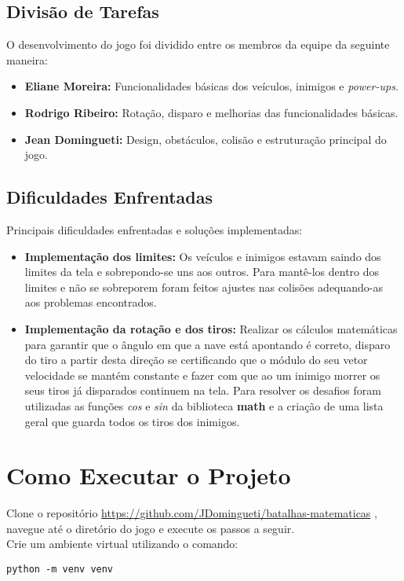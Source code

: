 \documentclass[12pt,a4paper]{article}
\begin{document}
\subsection{Divisão de Tarefas}
O desenvolvimento do jogo foi dividido entre os membros da equipe da seguinte maneira:
\begin{itemize}
    \item \textbf{Eliane Moreira:} Funcionalidades básicas dos veículos, inimigos e \textit{power-ups}.
    \item \textbf{Rodrigo Ribeiro:} Rotação, disparo e melhorias das funcionalidades básicas.
    \item \textbf{Jean Domingueti:} Design, obstáculos, colisão e estruturação principal do jogo.
\end{itemize}

\subsection{Dificuldades Enfrentadas}
Principais dificuldades enfrentadas e soluções implementadas: 
\begin{itemize}
    \item \textbf{Implementação dos limites:} Os veículos e inimigos estavam saindo dos limites da tela e sobrepondo-se uns aos outros. Para mantê-los dentro dos limites e não se sobreporem foram feitos ajustes nas colisões adequando-as aos problemas encontrados.
    \item \textbf{Implementação da rotação e dos tiros:} Realizar os cálculos matemáticas para garantir que o ângulo em que a nave está apontando é correto, disparo do tiro a partir desta direção se certificando que o módulo do seu vetor velocidade se mantém constante e fazer com que ao um inimigo morrer os seus tiros já disparados continuem na tela. Para resolver os desafios foram utilizadas as funções \textit{cos} e \textit{sin} da biblioteca \textbf{math} e a criação de uma lista geral que guarda todos os tiros dos inimigos. 
\end{itemize}

\section{Como Executar o Projeto}
Clone o repositório \url{https://github.com/JDomingueti/batalhas-matematicas} , navegue até o diretório do jogo e execute os passos a seguir. \\

Crie um ambiente virtual utilizando o comando:
\begin{verbatim}
python -m venv venv
\end{verbatim}
\end{document}

